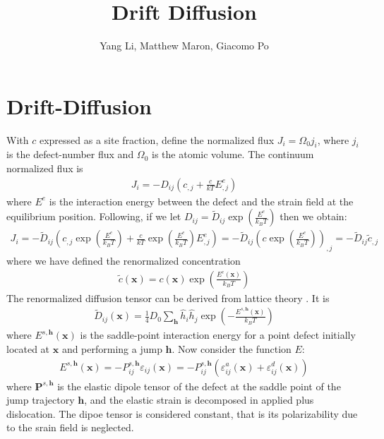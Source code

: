 \documentclass[10pt]{article}
\author{Yang Li, Matthew Maron, Giacomo Po}
\title{Drift Diffusion}
\begin{document}
\maketitle

\section{Drift-Diffusion}

With $c$ expressed as a site fraction, define the normalized flux
$J_i=\Omega_0 j_i$, where $j_i$ is the defect-number flux and $\Omega_0$
is the atomic volume. The continuum normalized flux is
\begin{align}
J_i=-D_{ij}\left(c_{,j}+\frac{c}{kT}E^e_{,j}\right)
\end{align}
where $E^e$ is the interaction energy between the defect and the strain field at the equilibrium position.
Following, if we let $D_{ij}=\tilde{D}_{ij}\exp\left(\frac{E^e}{k_BT}\right)$ then we obtain:
\begin{align}
J_i=-\tilde{D}_{ij}\left(c_{,j}\exp\left(\frac{E^e}{k_BT}\right)+\frac{c}{kT}\exp\left(\frac{E^e}{k_BT}\right)E^e_{,j}\right)=-\tilde{D}_{ij}\left(c\exp\left(\frac{E^e}{k_BT}\right)\right)_{,j}=-\tilde{D}_{ij}\tilde{c}_{,j}
\end{align}
where we have defined the renormalized concentration
\begin{align}
\tilde{c}(\bm x)=c(\bm x)\exp\left(\frac{E^e(\bm x)}{k_BT}\right)
\end{align}
The renormalized diffusion tensor can be derived from  lattice theory \cite{Dederichs1978,DaFonseca2023}. It is
\begin{align}
\tilde{D}_{ij}(\bm x)=\frac{1}{4}D_0\sum_{\bm h} \hat{h}_i\hat{h}_j\exp\left(-\frac{E^{s,\bm h}(\bm x)}{k_BT}\right)
\label{Dt}
\end{align}
where $E^{s,\bm h}(\bm x)$ is the saddle-point interaction energy for a point defect initially located at $\bm x$ and performing a jump $\bm h$. 
Now consider the function $E$:
\begin{align}
E^{s,\bm h}(\bm x)=-P^{s,\bm h}_{ij}\varepsilon_{ij}(\bm x) = -P^{s,\bm h}_{ij}\left(\varepsilon^a_{ij}(\bm x) + \varepsilon^d_{ij}(\bm x)\right)
\end{align}
where $\bm P^{s,\bm h}$ is the elastic dipole tensor of the defect at the saddle point of the jump trajectory $\bm h$, and the elastic strain is decomposed in applied plus dislocation. The dipoe tensor is considered constant, that is its polarizability due to the srain field is neglected. 
\end{document}
